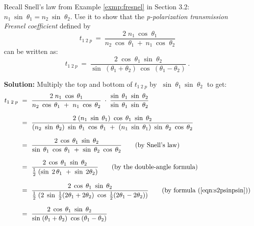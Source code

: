\divider\vspace{-2mm}
\newpage
\begin{exmp}\label{exmp:fresnelp}
 Recall Snell's law from Example \ref{exmp:fresnel} in Section 3.2: $n_1 ~\sin\;\theta_1 =
 n_2 ~\sin\;\theta_2$. Use it to show that the \emph{p-polarization transmission Fresnel
 coefficient} defined by
 \begin{equation}
  t_{1\;2\;p} ~=~ \frac{2\;n_1 ~\cos\;\theta_1}{n_2 ~\cos\;\theta_1 ~+~ n_1 ~\cos\;\theta_2}
 \end{equation}
 can be written as:
 \begin{displaymath}
  t_{1\;2\;p} ~=~ \frac{2\;\cos\;\theta_1~\sin\;\theta_2}{\sin\;(\theta_1 + \theta_2)~
   \cos\;(\theta_1 - \theta_2)} ~.
 \end{displaymath}
 \par\noindent\textbf{Solution:} Multiply the top and bottom of $t_{1\;2\;p}$ by $\;\sin\;\theta_1
  ~\sin\;\theta_2\;$ to get:
 \begin{align*}
  t_{1\;2\;p} ~&=~ \frac{2\;n_1 ~\cos\;\theta_1}{n_2 ~\cos\;\theta_1 ~+~ n_1 ~\cos\;\theta_2}
    \;\cdot\; \frac{\sin\;\theta_1 ~ \sin\;\theta_2}{\sin\;\theta_1 ~
   \sin\;\theta_2}\\[7pt]
  &=~ \frac{2\;(n_1 ~\sin\;\theta_1)~\cos\;\theta_1 ~\sin\;\theta_2}{
            (n_2 ~\sin\;\theta_2)~\sin\;\theta_1 ~\cos\;\theta_1 ~+~
            (n_1 ~\sin\;\theta_1)~\sin\;\theta_2 ~\cos\;\theta_2}\\[7pt]
  &=~ \frac{2\;\cos\;\theta_1~\sin\;\theta_2}{
            \sin\;\theta_1 ~\cos\;\theta_1 ~+~ \sin\;\theta_2 ~\cos\;\theta_2}
			\qquad\text{(by Snell's law)}\\[7pt]
  &=~ \frac{2\;\cos\;\theta_1~\sin\;\theta_2}{
            \tfrac{1}{2}\;(\sin\;2\,\theta_1 ~+~ \sin\;2\theta_2)}
			\qquad\text{(by the double-angle formula)}\\[7pt]
  &=~ \frac{2\;\cos\;\theta_1~\sin\;\theta_2}{
            \tfrac{1}{2}\;(2\;\sin\;\tfrac{1}{2}(2\theta_1 + 2\theta_2)~
			\cos\;\tfrac{1}{2}(2\theta_1 - 2\theta_2))}
			\qquad\text{(by formula (\ref{eqn:s2psinpsin}))}\\[7pt]
  &=~ \frac{2\;\cos\;\theta_1~\sin\;\theta_2}{\sin\;(\theta_1 + \theta_2)~
   \cos\;(\theta_1 - \theta_2)}
 \end{align*}
\end{exmp}
